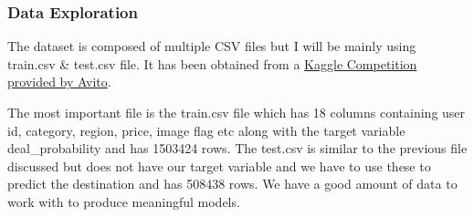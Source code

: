 \documentclass[11pt]{article}
\begin{document}
    \hypertarget{data-exploration}{%
\subsubsection{Data Exploration}\label{data-exploration}}

    The dataset is composed of multiple CSV files but I will be mainly using
train.csv \& test.csv file. It has been obtained from a
\href{https://www.kaggle.com/c/avito-demand-prediction/data}{Kaggle
Competition provided by Avito}.

The most important file is the train.csv file which has 18 columns
containing user id, category, region, price, image flag etc along with
the target variable deal\_probability and has 1503424 rows. The test.csv
is similar to the previous file discussed but does not have our target
variable and we have to use these to predict the destination and has
508438 rows. We have a good amount of data to work with to produce
meaningful models.
\end{document}
